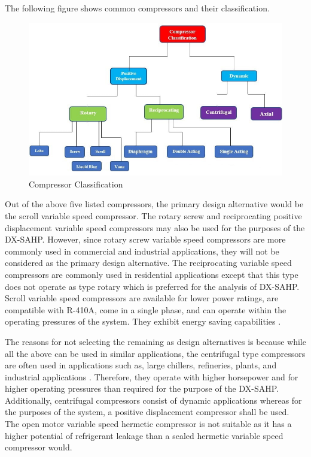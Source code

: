 \medskip
The following figure shows common compressors and their classification.

\medskip
\begin{figure}[ht]
    \centering
    \includegraphics[width=\textwidth]{images/compressor_types.jpg}
    \caption{Compressor Classification \cite{air_compressor}}
\end{figure}

\medskip
Out of the above five listed compressors, the primary design alternative would be the scroll variable speed compressor. The rotary screw and reciprocating positive displacement variable speed compressors may also be used for the purposes of the DX-SAHP. However, since rotary screw variable speed compressors are more commonly used in commercial and industrial applications, they will not be considered as the primary design alternative. The reciprocating variable speed compressors are commonly used in residential applications except that this type does not operate as type rotary which is preferred for the analysis of DX-SAHP. Scroll variable speed compressors are available for lower power ratings, are compatible with R-410A, come in a single phase, and can operate within the operating pressures of the system. They exhibit energy saving capabilities \cite{scroll_compressor} \cite{what_scroll_compressor}.

\medskip
The reasons for not selecting the remaining as design alternatives is because while all the above can be used in similar applications, the centrifugal type compressors are often used in applications such as, large chillers, refineries, plants, and industrial applications \cite{centrifugal_compressor}. Therefore, they operate with higher horsepower and for higher operating pressures than required for the purpose of the DX-SAHP. Additionally, centrifugal compressors consist of dynamic applications whereas for the purposes of the system, a positive displacement compressor shall be used. The open motor variable speed hermetic compressor is not suitable as it has a higher potential of refrigerant leakage than a sealed hermetic variable speed compressor would.


